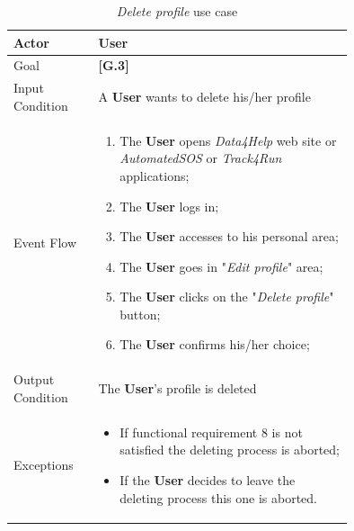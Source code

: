 \begin{center}
\begin{table}[H]
\begin{tabular}{ | l | p{0.75\linewidth} | }
  \hline
    Actor & \textbf{User} \\ \hline
    Goal & \textbf{[G.3]} \\ \hline
    Input Condition & A \textbf{User} wants to delete his/her profile\\ \hline
    Event Flow & \begin{minipage}[t]{0.7\textwidth}
      \begin{enumerate}
        \item The \textbf{User} opens \textit{Data4Help} web site or \textit{AutomatedSOS} or \textit{Track4Run} applications;
        \item The \textbf{User} logs in;
        \item The \textbf{User} accesses to his personal area;
        \item The \textbf{User} goes in "\textit{Edit profile}" area;
        \item The \textbf{User} clicks on the "\textit{Delete profile}" button;
        \item The \textbf{User} confirms his/her choice;
      \end{enumerate}
    \smallskip
  \end{minipage} \\ \hline
  Output Condition & The \textbf{User}'s  profile is deleted\\ \hline
  Exceptions & \begin{minipage}[t]{0.7\textwidth}
    \begin{itemize}
      \smallskip
      \item If functional requirement 8 is not satisfied the deleting process is aborted;
      \item If the \textbf{User} decides to leave the deleting process this one is aborted.
    \end{itemize}
    \smallskip
  \end{minipage}  \\ \hline
\end{tabular}
\caption{\textit{Delete profile} use case}
\label{table:deleteProfileTable}
\end{table}
\end{center}

